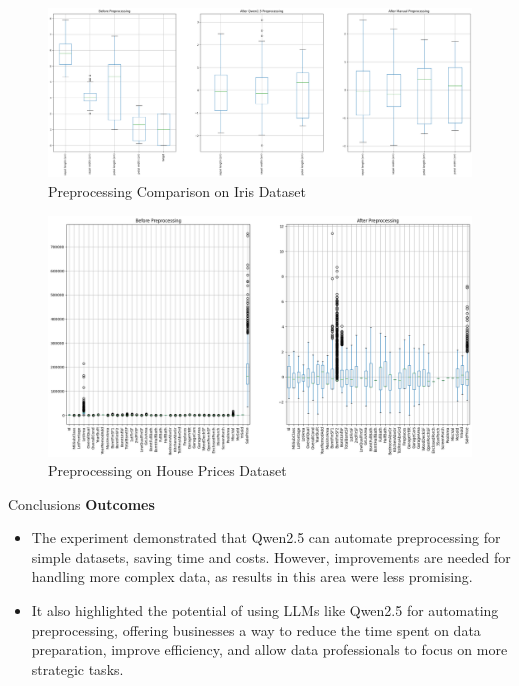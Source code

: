 \documentclass{beamer}
\begin{document}
\begin{frame}
    \begin{figure}
        \centering
        \includegraphics[width=\textwidth]{comparison_iris_with_manual.png}
        \caption{Preprocessing Comparison on Iris Dataset}
    \end{figure}
\end{frame}

\begin{frame}
    \begin{figure}
        \centering
        \includegraphics[width=\textwidth]{comparison_house_prices.png}
        \caption{Preprocessing on House Prices Dataset}
    \end{figure}
\end{frame}


\begin{frame}{Conclusions}
    \textbf{\textcolor{myBlue}{Outcomes}}
    \vspace{0.2cm}
    \begin{itemize}
        \item The experiment demonstrated that Qwen2.5 can automate preprocessing for simple datasets, saving time and costs. However, improvements are needed for handling more complex data, as results in this area were less promising. 
        \item It also highlighted the potential of using LLMs like Qwen2.5 for automating preprocessing, offering businesses a way to reduce the time spent on data preparation, improve efficiency, and allow data professionals to focus on more strategic tasks.
    \end{itemize}
\end{frame}
\end{document}
